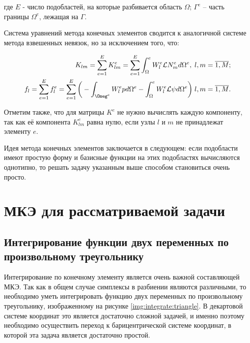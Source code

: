 \documentclass[14pt]{extreport}
\begin{document}
\noindent где $E$ - число подобластей, на которые разбивается область $\Omega$; $\Gamma^e$ -- часть границы $\Omega^e$, лежащая на $\Gamma$.

Система уравнений метода конечных элементов сводится к аналогичной системе метода взвешенных невязок, но за исключением того, что:

\begin{eqnarray}
K_{lm}=\sum\limits_{e=1}^{E} K_{lm}^{e}=\sum\limits_{e=1}^{E}\int_\Omega^{e} W_l^{e} \mathcal L N_{m}^{e}  d\Omega^{e}, \; l, m=\overline{1,M}; \\
f_l=\sum\limits_{e=1}^{E} f_{l}^{e}=\sum\limits_{e=1}^{E} \bigg(-\int_{\Omeg^{e}} W_{l}^{e} p d \Omega^{e} -\int_\Omega^{e} W_{l}^{e} \mathcal L \psi d \Omega^{e}\bigg) \; l, m=\overline{1,M}. 
\end{eqnarray}

Отметим также, что для матрицы $K^{e}$ не нужно вычислять каждую компоненту, так как её компонента $K_{lm}^{e}$ равна нулю, если узлы $l$ и $m$ не принадлежат элементу $e$. 

Идея метода конечных элементов заключается в следующем: если подобласти имеют простую форму и базисные функции на этих подобластях вычисляются однотипно, то решать задачу указанным выше способом становиться очень просто. 


\section{МКЭ для рассматриваемой задачи}


\subsection{Интегрирование функции двух переменных по произвольному треугольнику}

Интегрирование по конечному элементу является очень важной составляющей МКЭ. Так как в общем случае симплексы в разбиении являются различными, то необходимо уметь интегрировать функцию двух переменных по произвольному треугольнику, изображенному на рисунке \ref{img:integrate:triangle}. В декартовой системе координат это является достаточно сложной задачей, и именно поэтому необходимо осуществить переход к барицентрической системе координат, в которой эта задача является достаточно простой.
\end{document}

